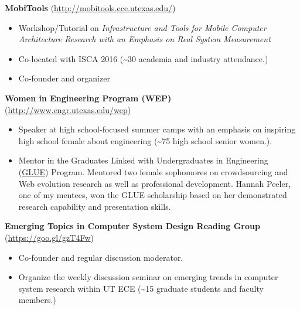 \documentclass[margin, 9pt]{res} %
\begin{document}
\begin{resume}
\medskip
\textbf{MobiTools} (\url{http://mobitools.ece.utexas.edu/})
\begin{itemize}[leftmargin=*] \itemsep -3pt
\vspace*{-4pt}
	\item Workshop/Tutorial on \textit{Infrastructure and Tools for Mobile Computer Architecture Research with an Emphasis on Real System Measurement} \par
        \item Co-located with ISCA 2016 (\textasciitilde 30 academia and industry attendance.)
	\item Co-founder and organizer \par
\end{itemize}

\medskip
\textbf{Women in Engineering Program (WEP)} (\url{http://www.engr.utexas.edu/wep})\\
\vspace*{-10pt}
\begin{itemize}[leftmargin=*] \itemsep -3pt
\vspace*{-5pt}
        \item Speaker at high school-focused summer camps with an emphasis on inspiring high school female about engineering (\textasciitilde 75 high school senior women.).
	\item Mentor in the Graduates Linked with Undergraduates in Engineering (\href{http://www.engr.utexas.edu/wep/career/glue}{GLUE}) Program. Mentored two female sophomores on crowdsourcing and Web evolution research as well as professional development. Hannah Peeler, one of my mentees, won the GLUE scholarship based on her demonstrated research capability and presentation skills. \par
\end{itemize}

\medskip
\medskip
\textbf{Emerging Topics in Computer System Design Reading Group} (\url{https://goo.gl/gzT4Fw})\\
\vspace*{-10pt}
\begin{itemize}[leftmargin=*] \itemsep -3pt
\vspace*{-5pt}
	\item Co-founder and regular discussion moderator. \par
	\item Organize the weekly discussion seminar on emerging trends in computer system research within UT ECE (\textasciitilde 15 graduate students and faculty members.) \par
\end{itemize}


\end{resume}
\end{document}
